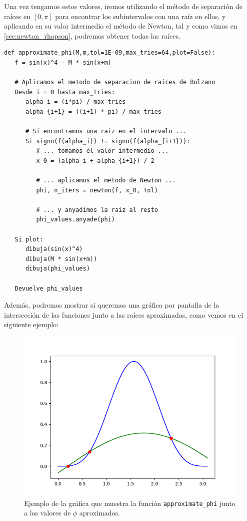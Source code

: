 \documentclass[11pt]{book}
\begin{document}
Una vez tengamos estos valores, iremos utilizando el método de separación de raíces en $[0,\pi]$ para encontrar los subintervalos con una raíz en ellos, y aplicando en su valor intermedio el método de Newton, tal y como vimos en \ref{sec:newton_rhapson}, podremos obtener todas las raíces.
\begin{lstlisting}[style=PythonCode]
def approximate_phi(M,m,tol=1E-09,max_tries=64,plot=False):	
   f = sin(x)^4 - M * sin(x+m)
   
   # Aplicamos el metodo de separacion de raices de Bolzano
   Desde i = 0 hasta max_tries:
      alpha_i = (i*pi) / max_tries
      alpha_{i+1} = ((i+1) * pi) / max_tries
      
      # Si encontramos una raiz en el intervalo ...
      Si signo(f(alpha_i)) != signo(f(alpha_{i+1})):
         # ... tomamos el valor intermedio ...
         x_0 = (alpha_i + alpha_{i+1}) / 2
         
         # ... aplicamos el metodo de Newton ...
         phi, n_iters = newton(f, x_0, tol)
         
         # ... y anyadimos la raiz al resto
         phi_values.anyade(phi)
   
   Si plot:
      dibuja(sin(x)^4)
      dibuja(M * sin(x+m))
      dibuja(phi_values)
   
   Devuelve phi_values
\end{lstlisting}

Además, podremos mostrar si queremos una gráfica por pantalla de la intersección de las funciones junto a las raíces aproximadas, como vemos en el siguiente ejemplo:

\begin{figure}[H]
\centering
\includegraphics[scale=0.6]{images/example_newton.png}
\caption{Ejemplo de la gráfica que muestra la función \texttt{approximate\_phi} junto a los valores de $\phi$ aproximados.}
\end{figure}
\end{document}
